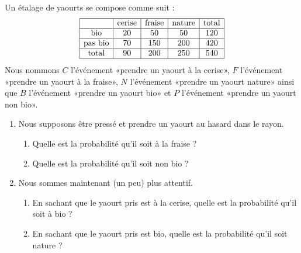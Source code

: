 
\begin{exercice}\label{exosmath-0712}

    Un étalage de yaourts se compose comme suit :
    \begin{equation*}
        \begin{array}[]{|c|c|c|c|c|}
            \hline
            &\text{cerise}&\text{fraise}&\text{nature}&\text{total}\\
            \hline
            \text{bio}&20&50&50&120\\
            \hline
            \text{pas bio}&70&150&200&420\\
            \hline
            \text{total}&90&200&250&540\\
            \hline
        \end{array}
    \end{equation*}
    Nous nommons \( C\) l'événement «prendre un yaourt à la cerise», \( F\) l'événement «prendre un yaourt à la fraise», \( N\) l'événement «prendre un yaourt nature» ainsi que \( B\) l'événement «prendre un yaourt bio» et \( P\) l'événement «prendre un yaourt non bio».

    \begin{enumerate}
        \item
            
            Nous supposons être pressé et prendre un yaourt au hasard dans le rayon.
            \begin{enumerate}
                \item
                    Quelle est la probabilité qu'il soit à la fraise ?
                \item
                    Quelle est la probabilité qu'il soit non bio ?
            \end{enumerate}

        \item
            Nous sommes maintenant (un peu) plus attentif.

            \begin{enumerate}
                \item
                    En sachant que le yaourt pris est à la cerise, quelle est la probabilité qu'il soit à bio ?
                \item
                    En sachant que le yaourt pris est bio, quelle est la probabilité qu'il soit nature ?
            \end{enumerate}


\end{enumerate}
\end{exercice}
